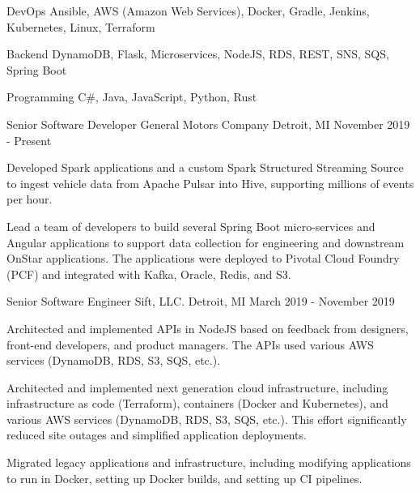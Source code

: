 \documentclass[11pt, a4paper]{awesome-cv}
\begin{document}
\makecvheader[C]


\begin{cvskills}
    \cvskill
    {DevOps}
    {Ansible, AWS (Amazon Web Services), Docker, Gradle, Jenkins, Kubernetes, Linux, Terraform}

    \cvskill
    {Backend}
    {DynamoDB, Flask, Microservices, NodeJS, RDS, REST, SNS, SQS, Spring Boot}

    \cvskill
    {Programming}
    {C\#, Java, JavaScript, Python, Rust}
\end{cvskills}

\begin{cventries}
    \cventry
    {Senior Software Developer}
    {General Motors Company}
    {Detroit, MI}
    {November 2019 - Present}
    {
        \begin{cvitems}
            \item{Developed Spark applications and a custom Spark Structured Streaming Source to ingest vehicle data from Apache Pulsar into Hive, supporting millions of events per hour.}
            \item{
                Lead a team of developers to build several Spring Boot micro-services and Angular applications to support data collection for engineering and downstream OnStar applications. 
                The applications were deployed to Pivotal Cloud Foundry (PCF) and integrated with Kafka, Oracle, Redis, and S3.
            }
        \end{cvitems}
    }

    \cventry
    {Senior Software Engineer}
    {Sift, LLC.}
    {Detroit, MI}
    {March 2019 - November 2019}
    {
        \begin{cvitems}
            \item{Architected and implemented APIs in NodeJS based on feedback from designers, front-end developers, and product managers. The APIs used various AWS services (DynamoDB, RDS, S3, SQS, etc.).}
            \item{Architected and implemented next generation cloud infrastructure, including infrastructure as code (Terraform), containers (Docker and Kubernetes), and various AWS services (DynamoDB, RDS, S3, SQS, etc.). This effort significantly reduced site outages and simplified application deployments.}
            \item{Migrated legacy applications and infrastructure, including modifying applications to run in Docker, setting up Docker builds, and setting up CI pipelines.}
        \end{cvitems}
    }


\end{cventries}
\end{document}
